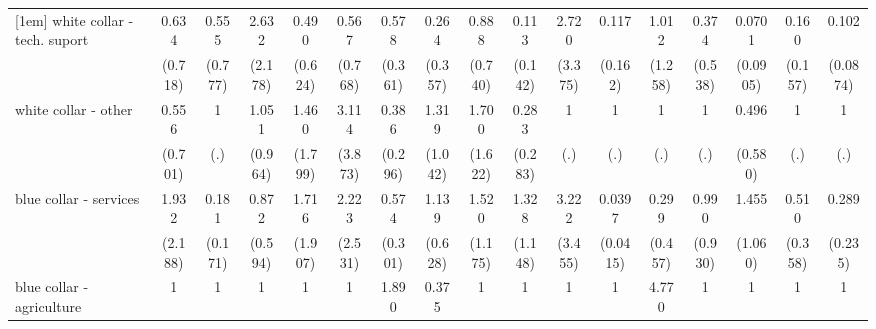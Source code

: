 {\begin{tabular}{l*{16}{c}}
[1em]
white collar - tech. suport&       0.634         &       0.555         &       2.632         &       0.490         &       0.567         &       0.578         &       0.264         &       0.888         &       0.113         &       2.720         &       0.117         &       1.012         &       0.374         &      0.0701\sym{*}  &       0.160         &       0.102\sym{**} \\
                    &     (0.718)         &     (0.777)         &     (2.178)         &     (0.624)         &     (0.768)         &     (0.361)         &     (0.357)         &     (0.740)         &     (0.142)         &     (3.375)         &     (0.162)         &     (1.258)         &     (0.538)         &    (0.0905)         &     (0.157)         &    (0.0874)         \\
[1em]
white collar - other&       0.556         &           1         &       1.051         &       1.460         &       3.114         &       0.386         &       1.319         &       1.700         &       0.283         &           1         &           1         &           1         &           1         &       0.496         &           1         &           1         \\
                    &     (0.701)         &         (.)         &     (0.964)         &     (1.799)         &     (3.873)         &     (0.296)         &     (1.042)         &     (1.622)         &     (0.283)         &         (.)         &         (.)         &         (.)         &         (.)         &     (0.580)         &         (.)         &         (.)         \\
[1em]
blue collar - services&       1.932         &       0.181         &       0.872         &       1.716         &       2.223         &       0.574         &       1.139         &       1.520         &       1.328         &       3.222         &      0.0397\sym{**} &       0.299         &       0.990         &       1.455         &       0.510         &       0.289         \\
                    &     (2.188)         &     (0.171)         &     (0.594)         &     (1.907)         &     (2.531)         &     (0.301)         &     (0.628)         &     (1.175)         &     (1.148)         &     (3.455)         &    (0.0415)         &     (0.457)         &     (0.930)         &     (1.060)         &     (0.358)         &     (0.235)         \\
[1em]
blue collar - agriculture&           1         &           1         &           1         &           1         &           1         &       1.890         &       0.375         &           1         &           1         &           1         &           1         &       4.770         &           1         &           1         &           1         &           1         \\

\end{tabular}}
